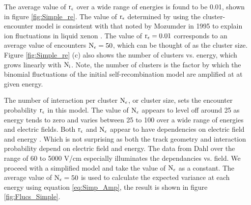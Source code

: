 The average value of $\rm r_\epsilon$ over a wide range of energies is found to be 0.01, shown in figure \ref{fig:Simple_re}. The value of  $\rm r_\epsilon$ determined by using the cluster-encounter model is consistent with that noted by Mozumder in 1995 to explain ion fluctuations in liquid xenon \cite{Mozumder}. The value of  $\rm r_\epsilon=0.01$ corresponds to an average value of encounters $\rm N_\epsilon = 50$, which can be thought of as the cluster size. Figure \ref{fig:Simple_re} (c) also shows the number of clusters vs. energy, which grows linearly with $\rm N_i$.  Note, the number of clusters is the factor by which the binomial fluctuations of the initial self-recombination model are amplified at at given energy.


The number of interaction per cluster $\rm N_\epsilon$, or cluster size, sets the encounter probability $\rm r_\epsilon$ in this model. The value of $\rm N_\epsilon$ appears to level off around 25 as energy tends to zero and varies between 25 to 100 over a wide range of energies and electric fields. Both $\rm r_\epsilon$ and $\rm N_\epsilon$ appear to have dependencies on electric field and energy . Which is not surprising as both the track geometry and interaction probability depend on electric field and energy. The data from Dahl over the range of 60 to 5000 V/cm especially illuminates the dependancies vs. field. We proceed with a simplified model and take the value of  $\rm N_\epsilon$ as a constant. The average value of $\rm N_\epsilon =50$ is used to calculate the expected variance at each energy using equation \ref{eq:Simp_Amp}, the result is shown in figure \ref{fig:Flucs_Simple}.

\newpage 

